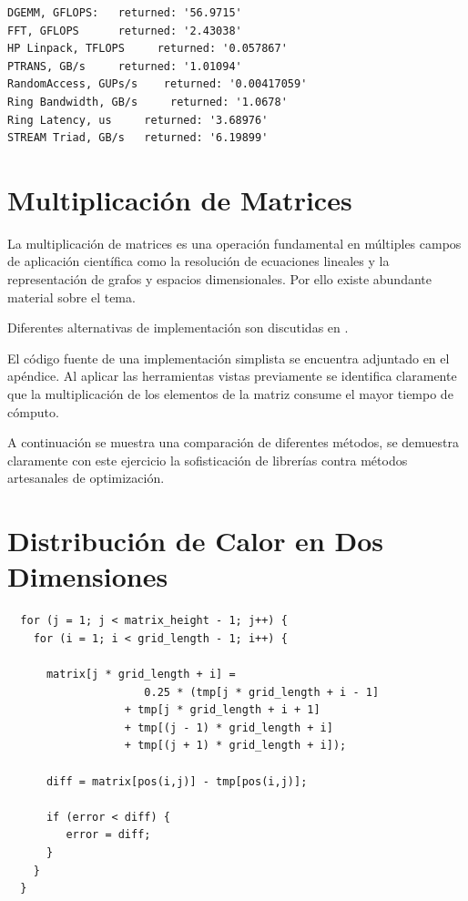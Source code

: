 \documentclass[a4paper]{report}
\begin{document}
\begin{verbatim}
DGEMM, GFLOPS:   returned: '56.9715'
FFT, GFLOPS      returned: '2.43038'
HP Linpack, TFLOPS     returned: '0.057867'
PTRANS, GB/s     returned: '1.01094'
RandomAccess, GUPs/s    returned: '0.00417059'
Ring Bandwidth, GB/s     returned: '1.0678'
Ring Latency, us     returned: '3.68976'
STREAM Triad, GB/s   returned: '6.19899'
\end{verbatim}

\section{Multiplicaci\'on de Matrices}

La multiplicaci\'on de matrices es una operaci\'on fundamental en m\'ultiples
campos de aplicaci\'on cient\'ifica como la resoluci\'on de ecuaciones
lineales y la representaci\'on de grafos y espacios dimensionales. Por ello
existe abundante material sobre el tema.

{\small

}

Diferentes alternativas de implementaci\'on son discutidas en
\cite{mm-matrixmultiplicationtool}.

\bigskip

El c\'odigo fuente de una implementaci\'on simplista se encuentra adjuntado en
el ap\'endice. Al aplicar las herramientas vistas previamente se identifica
claramente que la multiplicaci\'on de los elementos de la matriz consume el
mayor tiempo de c\'omputo.

\bigskip

A continuaci\'on se muestra una comparaci\'on de diferentes m\'etodos, se
demuestra claramente con este ejercicio la sofisticaci\'on de librer\'ias
contra m\'etodos artesanales de optimizaci\'on.

\section{Distribuci\'on de Calor en Dos Dimensiones}

\begin{verbatim}
  for (j = 1; j < matrix_height - 1; j++) {
    for (i = 1; i < grid_length - 1; i++) {
      
      matrix[j * grid_length + i] = 
                     0.25 * (tmp[j * grid_length + i - 1]
                  + tmp[j * grid_length + i + 1]
                  + tmp[(j - 1) * grid_length + i]
                  + tmp[(j + 1) * grid_length + i]);

      diff = matrix[pos(i,j)] - tmp[pos(i,j)];

      if (error < diff) {
         error = diff;
      }
    }
  }
\end{verbatim}
\end{document}
